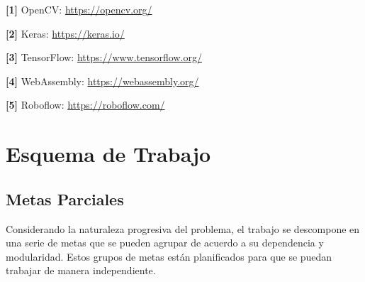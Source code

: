 \documentclass[a4paper]{article}
\begin{document}
\textbf{[1]} OpenCV: \url{https://opencv.org/}

\textbf{[2]} Keras: \url{https://keras.io/}

\textbf{[3]} TensorFlow: \url{https://www.tensorflow.org/}

\textbf{[4]} WebAssembly: \url{https://webassembly.org/}

\textbf{[5]} Roboflow: \url{https://roboflow.com/}

\section{Esquema de Trabajo}
\subsection{Metas Parciales}

Considerando la naturaleza progresiva del problema, el trabajo se descompone en una serie de metas que se pueden agrupar de acuerdo a su dependencia y modularidad. Estos grupos de metas están planificados para que se puedan trabajar de manera independiente.
\end{document}
